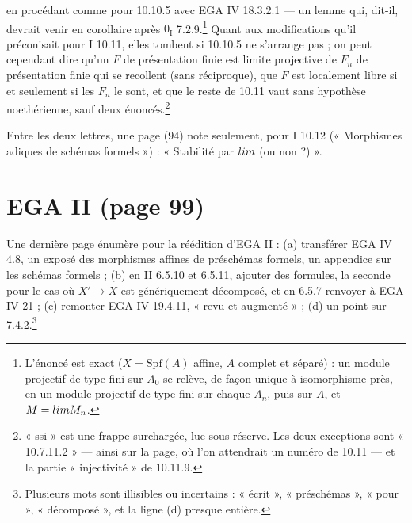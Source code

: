 \documentclass[11pt,a4paper]{article}
\begin{document}
en procédant comme pour 10.10.5 avec EGA IV 18.3.2.1 --- un lemme qui, dit-il,
devrait venir en corollaire après $0_{\mathrm{I}}$ 7.2.9.\footnote{L'énoncé
est exact ($X = \mathrm{Spf}(A)$ affine, $A$ complet et séparé) : un module
projectif de type fini sur $A_0$ se relève, de façon unique à isomorphisme
près, en un module projectif de type fini sur chaque $A_n$, puis sur $A$, et
$M = \varprojlim M_n$.}
Quant aux modifications qu'il préconisait pour I 10.11, elles tombent si
10.10.5 ne s'arrange pas ; on peut cependant dire qu'un $F$ de présentation
finie est limite projective de $F_n$ de présentation finie qui se recollent
(sans réciproque), que $F$ est localement libre si et seulement si les $F_n$
le sont, et que le reste de 10.11 vaut sans hypothèse noethérienne, sauf deux
énoncés.\footnote{« ssi » est une frappe surchargée, lue sous réserve. Les
deux exceptions sont « 10.7.11.2 » --- ainsi sur la page, où l'on attendrait
un numéro de 10.11 --- et la partie « injectivité » de 10.11.9.}

Entre les deux lettres, une page (94) note seulement, pour I 10.12
(« Morphismes adiques de schémas formels ») : « Stabilité par
$\varprojlim$ (ou non ?) ».

\section*{EGA II (page 99)}

Une dernière page énumère pour la réédition d'EGA II : (a) transférer
EGA IV 4.8, un exposé des morphismes affines de préschémas formels, un
appendice sur les schémas formels ; (b) en II 6.5.10 et 6.5.11, ajouter des
formules, la seconde pour le cas où $X' \to X$ est génériquement décomposé, et
en 6.5.7 renvoyer à EGA IV 21 ; (c) remonter EGA IV 19.4.11, « revu et
augmenté » ; (d) un point sur 7.4.2.\footnote{Plusieurs mots sont illisibles
ou incertains : « écrit », « préschémas », « pour », « décomposé », et la
ligne (d) presque entière.}
\end{document}
